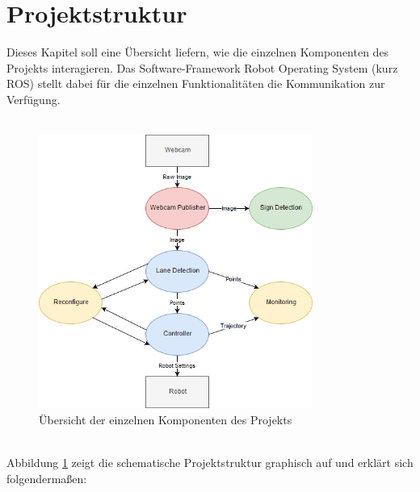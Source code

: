 \section{Projektstruktur}
\label{sec:projektstruktur}
Dieses Kapitel soll eine \"Ubersicht liefern, wie die einzelnen Komponenten des Projekts interagieren. Das Software-Framework Robot Operating System\cite{ROS} (kurz ROS) stellt dabei f\"ur die einzelnen Funktionalit\"aten die Kommunikation zur Verf\"ugung. \\\\
\begin{figure}[h]
	\centering
	\includegraphics[width = 0.8\textwidth]{images/Projektaufbau.png}
	\caption{\"Ubersicht der einzelnen Komponenten des Projekts}
	\label{fig:projektaufbau}
\end{figure}
\\
Abbildung \ref{fig:projektaufbau} zeigt die schematische Projektstruktur graphisch auf und erkl\"art sich folgenderma\ss{}en:
